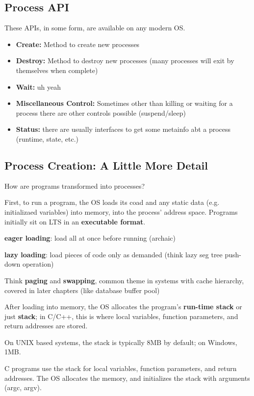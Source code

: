 \documentclass{article}
\begin{document}
\subsection{Process API}

These APIs, in some form, are available on any modern OS.

\begin{itemize}
    \item \textbf{Create: } Method to create new processes
    \item \textbf{Destroy: } Method to destroy new processes (many processes will exit by themselves when complete)
    \item \textbf{Wait: } uh yeah
    \item \textbf{Miscellaneous Control: } Sometimes other than killing or waiting for a process there are other controls possible (suspend/sleep)
    \item \textbf{Status: } there are usually interfaces to get some metainfo abt a process (runtime, state, etc.)

\end{itemize}

\subsection{Process Creation: A Little More Detail}

How are programs transformed into processes?

First, to run a program, the OS loads its coad and any static data (e.g. initializaed variables) into memory, into the process' address space.
Programs initially sit on LTS in an \textbf{executable format}.

\textbf{eager loading}: load all at once before running (archaic)

\textbf{lazy loading}: load pieces of code only as demanded (think lazy seg tree push-down operation)

Think \textbf{paging} and \textbf{swapping}, common theme in systems with cache hierarchy, covered in later chapters (like database buffer pool)

After loading into memory, the OS allocates the program's \textbf{run-time stack} or just \textbf{stack}; in C/C++, this is where local variables, function parameters, and return addresses are stored.

On UNIX based systems, the stack is typically 8MB by default; on Windows, 1MB.

C programs use the stack for local variables, function parameters, and return addresses.
The OS allocates the memory, and initializes the stack with arguments (argc, argv).
\end{document}
